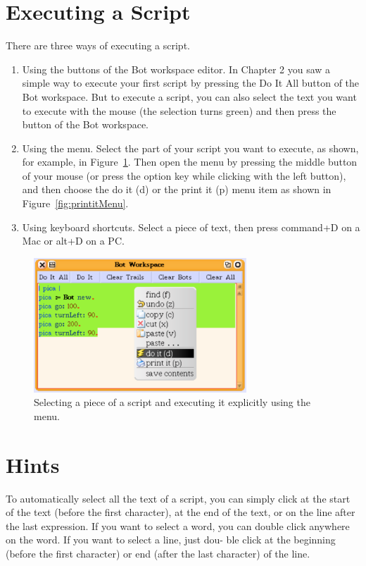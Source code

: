 \documentclass[a4paper,10pt,twoside]{book}
\begin{document}
\section{Executing a Script}
There are three ways of executing a script. 

\begin{enumerate}
\item Using the buttons of the Bot workspace editor. In Chapter 2 you saw a simple way to 
execute your first script by pressing the Do It All button of the Bot workspace. But 
to execute a script, you can also select the text you want to execute with the mouse 
(the selection turns green) and then press the  button of the Bot workspace. 
\item Using the menu. Select the part of your script you want to execute, as shown, for 
example, in Figure~\ref{fig:doitMenu}. Then open the menu by pressing the middle button of your 
mouse (or press the option key while clicking with the left button), and then choose 
the do it (d) or the print it (p) menu item as shown in Figure~\ref{fig:printitMenu}. 

\item Using keyboard shortcuts. Select a piece of text, then press command+D on a Mac or 
alt+D on a PC. 

\end{enumerate}

\begin{figure}[h]
\begin{center}
\includegraphics[width=8cm]{doitViaMenu}
\caption{Selecting a piece of a script and executing it explicitly using the menu.\label{fig:doitMenu}}
\end{center}
\end{figure}



\section{Hints}
To automatically select all the text of a script, you can simply click at the start of the text (before 
the first character), at the end of the text, or on the line after the last expression. If you want to 
select a word, you can double click anywhere on the word. If you want to select a line, just dou- 
ble click at the beginning (before the first character) or end (after the last character) of the line. 
\end{document}
